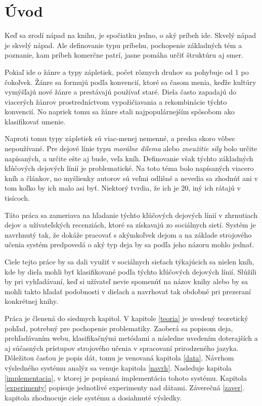 
\chapter{Úvod}

Keď sa zrodí nápad na knihu, je spočiatku jedno, o aký príbeh ide. Skvelý nápad je skvelý nápad. Ale definovanie typu príbehu, pochopenie základných tém a poznanie, kam príbeh komerčne patrí, jasne pomáha určiť štruktúru aj smer.

Pokiaľ ide o žánre a typy zápletiek, počet rôznych druhov sa pohybuje od 1 po čokoľvek. Žánre sa formujú podľa konvencií, ktoré sa časom menia, keďže kultúry vymýšľajú nové žánre a prestávajú používať staré. Diela často zapadajú do viacerých žánrov prostredníctvom vypožičiavania a rekombinácie týchto konvencií. No napriek tomu sa žánre stali najpopulárnejším spôsobom ako klasifikovať umenie.

Naproti tomu typy zápletiek sú viac-menej nemenné, a predsa skoro vôbec nepoužívané. Pre dejové línie typu \textit{morálne dilema} alebo \textit{zneužitie sily} bolo určite napísaných, a určite ešte aj bude, veľa kníh. Definovanie však týchto základných kľúčových dejových línií je problematické. Na toto téma bolo napísaných viacero kníh a článkov, no myšlienky autorov sú veľmi odlišné a nevedia sa zhodnúť ani v tom koľko by ich malo asi byť. Niektorý tvrdia, že ich je 20, iný ich rátajú v tisícoch. 

Táto práca sa zameriava na hľadanie týchto kľúčových dejových línií v zhrnutiach dejov a užívateľských recenziách, ktoré sa získavajú zo sociálnych sietí. Systém je navrhnutý tak, že dokáže pracovať s akýmkoľvek dejom a na základe strojového učenia systém predpovedá o aký typ deja by sa podľa jeho názoru mohlo jednať.

Ciele tejto práce by sa dali využiť v sociálnych sieťach týkajúcich sa nielen kníh, kde by diela mohli byť klasifikované podľa týchto kľúčových dejových línií. Slúžili by pri vyhľadávaní, keď si užívateľ nevie spomenúť na názov knihy alebo by sa mohli takto hľadať podobnosti v dielach a navrhovať tak obdobné pri prezeraní konkrétnej knihy.

Práca je členená do siedmych kapitol. V kapitole \ref{teoria} je uvedený teoretický pohľad, potrebný pre pochopenie problematiky. Zaoberá sa popisom deja, prehľadávaním webu, klasifikačnými metódami a následne uvedením doterajších a aj súčasných prístupov strojového učenia v spracovaní prirodzeného jazyka. Dôležitou časťou je popis dát, tomu je venovaná kapitola \ref{data}. Návrhom výsledného systému analýz sa venuje kapitola \ref{navrh}. Nasleduje kapitola \ref{implementacia}, v ktorej je popísaná implementácia tohoto systému. Kapitola \ref{experimenty} popisuje jednotlivé experimenty nad dátami. Záverečná \ref{zaver}. kapitola zhodnocuje ciele systému a dosiahnuté výsledky.

